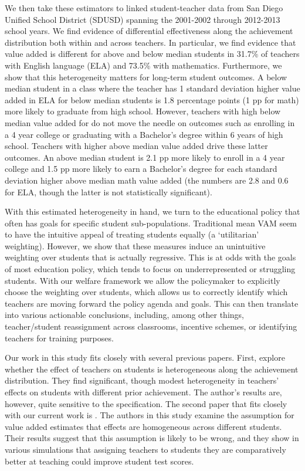 \documentclass[letterpaper,12pt]{article}
\begin{document}
We then take these estimators to linked student-teacher data from San Diego Unified School District (SDUSD) spanning the 2001-2002 through 2012-2013 school years. We find evidence of differential effectiveness along the achievement distribution both within and across teachers. In particular, we find evidence that value added is different for above and below median students in 31.7\% of teachers with English language (ELA) and 73.5\% with mathematics. Furthermore, we show that this heterogeneity matters for long-term student outcomes. A below median student in a class where the teacher has 1 standard deviation higher value added in ELA for below median students is 1.8 percentage points (1 pp for math) more likely to graduate from high school. However, teachers with high below median value added for do not move the needle on outcomes such as enrolling in a 4 year college or graduating with a Bachelor's degree within 6 years of high school. Teachers with higher above median value added drive these latter outcomes. An above median student is 2.1 pp more likely to enroll in a 4 year college and 1.5 pp more likely to earn a Bachelor's degree for each standard deviation higher above median math value added (the numbers are 2.8 and 0.6 for ELA, though the latter is not statistically significant).

With this estimated heterogeneity in hand, we turn to the educational policy that often has goals for specific student sub-populations. Traditional mean VAM seem to have the intuitive appeal of treating students equally (a `utilitarian' weighting). However, we show that these measures induce an unintuitive weighting over students that is actually regressive. This is at odds with the goals of most education policy, which tends to focus on underrepresented or struggling students. With our welfare framework we allow the policymaker to explicitly choose the weighting over students, which allows us to correctly identify which teachers are moving forward the policy agenda and goals. This can then translate into various actionable conclusions, including, among other things, teacher/student reassignment across classrooms, incentive schemes, or identifying teachers for training purposes.

Our work in this study fits closely with several previous papers. First, \citet{lockwood2009} explore whether the effect of teachers on students is heterogeneous along the achievement distribution. They find significant, though modest heterogeneity in teachers' effects on students with different prior achievement. The author's results are, however, quite sensitive to the specification. The second paper that fits closely with our current work is \citet{condie2014teacher}. The authors in this study examine the assumption for value added estimates that effects are homogeneous across different students. Their results suggest that this assumption is likely to be wrong, and they show in various simulations that assigning teachers to students they are comparatively better at teaching could improve student test scores.
\end{document}
